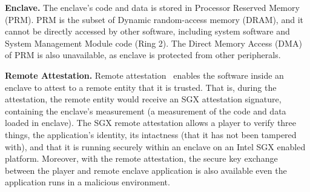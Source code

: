 \vspace{3mm}\noindent\textbf{Enclave.}
The enclave’s code and data is stored in Processor Reserved Memory (PRM). 
PRM is the subset of Dynamic random-access memory (DRAM), and it cannot be directly accessed by other software, including system software and System Management Module code (Ring 2).
The Direct Memory Access (DMA) of PRM is also unavailable, as enclave is protected from other peripherals.



\vspace{3mm}\noindent\textbf{Remote Attestation.} 
Remote attestation~\cite{costan2016intel} enables the software inside an  enclave to attest to a remote entity that it is trusted. That is, during the attestation, the remote entity would receive an SGX attestation signature, containing the enclave’s measurement (a measurement of the code and data loaded in enclave).
The SGX remote attestation allows a player to verify three things, the application's identity, its intactness (that it has not been tampered with), and that it is running securely within an enclave on an Intel SGX enabled platform.
Moreover, with the remote attestation, the secure key exchange between the player and remote enclave application is also available even the application runs in a malicious environment.

 